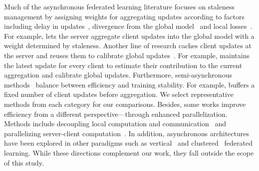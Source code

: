 Much of the asynchronous federated learning literature focuses on staleness management by assigning weights for aggregating updates according to factors including delay in updates~\cite{xie2019asynchronous}, divergence from the global model~\cite{su2022asynchronous,zang2024efficient} and local losses~\cite{liu2024fedasmu}. For example, \cite{xie2019asynchronous} lets the server aggregate client updates into the global model with a weight determined by staleness. Another line of research caches client updates at the server and reuses them to calibrate global updates~\cite{gu2021fast,wang2024tackling}. For example, \cite{wang2024tackling} maintains the latest update for every client to estimate their contribution to the current aggregation and calibrate global updates. Furthermore, semi-asynchronous methods~\cite{nguyen2022federated,zang2024efficient} balance between efficiency and training stability. For example, \cite{nguyen2022federated} buffers a fixed number of client updates before aggregation. We select representative methods from each category for our comparisons. Besides, some works improve efficiency from a different perspective---through enhanced parallelization. Methods include decoupling local computation and communication~\cite{avdiukhin2021federated} and parallelizing server-client computation~\cite{zhang2023no}. In addition, asynchronous architectures have been explored in other paradigms such as vertical~\cite{zhang2024asynchronous} and clustered~\cite{liu2024casa} federated learning. While these directions complement our work, they fall outside the scope of this study.
